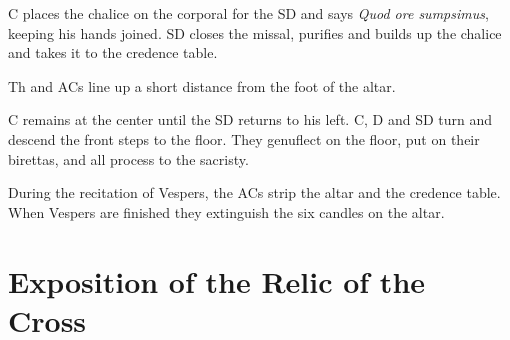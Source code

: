 {    \rubric C places the chalice on the corporal for the SD and says
    \textit{Quod ore sumpsimus}, keeping his hands joined. SD closes the
    missal, purifies and builds up the chalice and takes it to the credence
    table.

    \rubric Th and ACs line up a short distance from the foot of the altar.

    \rubric C remains at the center until the SD returns to his left. C, D and
    SD turn and descend the front steps to the floor. They genuflect on the
    floor, put on their birettas, and all process to the sacristy.

    \rubric During the recitation of Vespers, the ACs strip the altar and the
    credence table. When Vespers are finished they extinguish the six candles
    on the altar.

    \section{Exposition of the Relic of the Cross}

    }


